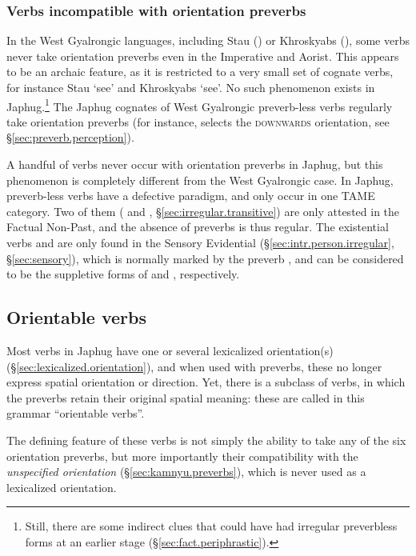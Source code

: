 \subsubsection{Verbs incompatible with orientation preverbs} \label{sec:verbs.no.preverbs}
In the West Gyalrongic languages, including Stau (\citealt[601]{jacques17stau}) or Khroskyabs (\citealt[311]{lai17khroskyabs}), some verbs never take orientation preverbs even in the Imperative and Aorist. This appears to be an archaic feature, as it is restricted to a very small set of cognate verbs, for instance Stau  `see' and Khroskyabs  `see'. No such phenomenon exists in Japhug.\footnote{
Still, there are some indirect clues that  could have had irregular preverbless forms at an earlier stage (§\ref{sec:fact.periphrastic}). } The Japhug cognates of West Gyalrongic preverb-less verbs regularly take orientation preverbs (for instance,  selects the \textsc{downwards} orientation, see §\ref{sec:preverb.perception}).

A handful of verbs never occur with orientation preverbs in Japhug, but this phenomenon is completely different from the West Gyalrongic case. In Japhug, preverb-less verbs have a defective paradigm, and only occur in one TAME category. Two of them ( and , §\ref{sec:irregular.transitive}) are only attested in the Factual Non-Past, and the absence of preverbs is thus regular. The existential verbs  and  are only found in the Sensory Evidential (§\ref{sec:intr.person.irregular}, §\ref{sec:sensory}), which is normally marked by the preverb , and can be considered to be the suppletive forms of   and , respectively. 

\subsection{Orientable verbs} \label{sec:orientable.verbs}
Most verbs in Japhug have one or several lexicalized orientation(s) (§\ref{sec:lexicalized.orientation}), and when used with preverbs, these no longer express spatial orientation or direction. Yet, there is a subclass of verbs, in which the preverbs retain their original spatial meaning: these are called in this grammar ``orientable verbs''.

The defining feature of these verbs is not simply the ability to take any of the six orientation preverbs, but more importantly their compatibility with the \textit{unspecified orientation} (§\ref{sec:kamnyu.preverbs}), which is never used as a lexicalized orientation.

